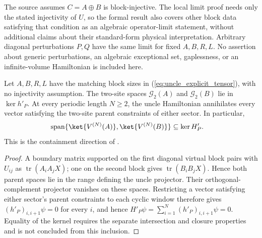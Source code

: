 The source assumes $C=A\oplus B$ is block-injective. The local limit proof
needs only the stated injectivity of $U$, so the formal result also covers
other block data satisfying that condition as an algebraic operator-limit
statement, without additional claims about their standard-form physical
interpretation. Arbitrary diagonal perturbations
$P,Q$ have the same limit for fixed $A,B,R,L$. No assertion about generic
perturbations, an algebraic exceptional set, gaplessness, or an
infinite-volume Hamiltonian is included here.

\begin{lemma}
    \label{lem:uncle_parent_sector_containment}
    \leanok
    Let $A,B,R,L$ have the matching block sizes in
    (\ref{eq:uncle_explicit_tensor}), with no injectivity assumption.
    The two-site spaces $\mathcal G_2(A)$ and $\mathcal G_2(B)$ lie in
    $\ker h'_P$. At every periodic length $N\ge2$, the uncle Hamiltonian
    annihilates every vector satisfying the two-site parent constraints of
    either sector. In particular,
    \begin{align}
        \operatorname{span}\{\ket{V^{(N)}(A)},\ket{V^{(N)}(B)}\}
         & \subseteq\ker H'_P.
    \end{align}
    This is the containment direction of
    \cite[ground-space theorem]{FernandezGonzalez2015Uncle}.
\end{lemma}
\begin{proof}
    \leanok
    A boundary matrix supported on the first diagonal virtual block pairs
    with $U_{ij}$ as $\operatorname{tr}(A_iA_jX)$; one on the second block
    gives $\operatorname{tr}(B_iB_jX)$. Hence both parent spaces lie in the
    range defining the uncle projector. Their orthogonal-complement
    projector vanishes on these spaces. Restricting a vector satisfying
    either sector's parent constraints to each cyclic window therefore
    gives $(h'_P)_{i,i+1}\psi=0$ for every $i$, and hence
    $H'_P\psi=\sum_{i=1}^N(h'_P)_{i,i+1}\psi=0$.
    Equality of the kernel requires the separate intersection and closure
    properties and is not concluded from this inclusion.
\end{proof}

